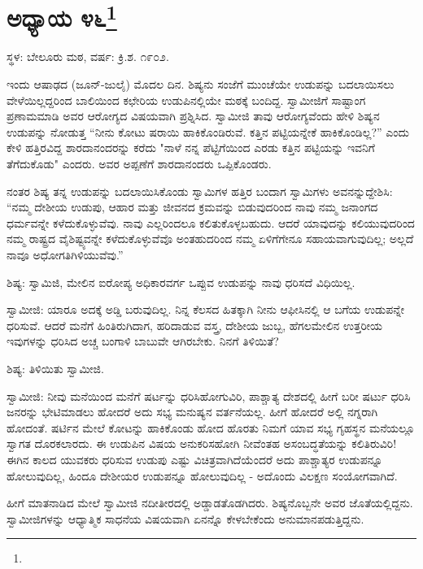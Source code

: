 \chapter[ಅಧ್ಯಾಯ ೪೬]{ಅಧ್ಯಾಯ ೪೬\protect\footnote{}}

\begin{center}
ಸ್ಥಳ: ಬೇಲೂರು ಮಠ, ವರ್ಷ: ಕ್ರಿ.ಶ. ೧೯೦೨.
\end{center}

ಇಂದು ಆಷಾಢದ (ಜೂನ್-ಜುಲೈ) ಮೊದಲ ದಿನ. ಶಿಷ್ಯನು ಸಂಜೆಗೆ ಮುಂಚೆಯೇ ಉಡುಪನ್ನು ಬದಲಾಯಿಸಲು ವೇಳೆಯಿಲ್ಲದ್ದರಿಂದ ಬಾಲಿಯಿಂದ ಕಛೇರಿಯ ಉಡುಪಿನಲ್ಲಿಯೇ ಮಠಕ್ಕೆ ಬಂದಿದ್ದ. ಸ್ವಾಮೀಜಿಗೆ ಸಾಷ್ಟಾಂಗ ಪ್ರಣಾಮಮಾಡಿ ಅವರ ಆರೋಗ್ಯದ ವಿಷಯವಾಗಿ ಪ್ರಶ್ನಿಸಿದ. ಸ್ವಾಮೀಜಿ ತಾವು ಆರೋಗ್ಯವೆಂದು ಹೇಳಿ ಶಿಷ್ಯನ ಉಡುಪನ್ನು ನೋಡುತ್ತ “ನೀನು ಕೋಟು ಷರಾಯಿ ಹಾಕಿಕೊಂಡಿರುವೆ. ಕತ್ತಿನ ಪಟ್ಟಿಯನ್ನೇಕೆ ಹಾಕಿಕೊಂಡಿಲ್ಲ?” ಎಂದು ಕೇಳಿ ಹತ್ತಿರವಿದ್ದ ಶಾರದಾನಂದರನ್ನು ಕರೆದು "ನಾಳೆ ನನ್ನ ಪೆಟ್ಟಿಗೆಯಿಂದ ಎರಡು ಕತ್ತಿನ ಪಟ್ಟಿಯನ್ನು ಇವನಿಗೆ ತೆಗೆದುಕೊಡು" ಎಂದರು. ಅವರ ಅಪ್ಪಣೆಗೆ ಶಾರದಾನಂದರು ಒಪ್ಪಿಕೊಂಡರು.

ನಂತರ ಶಿಷ್ಯ ತನ್ನ ಉಡುಪನ್ನು ಬದಲಾಯಿಸಿಕೊಂಡು ಸ್ವಾಮಿಗಳ ಹತ್ತಿರ ಬಂದಾಗ ಸ್ವಾಮಿಗಳು ಅವನನ್ನುದ್ದೇಶಿಸಿ: “ನಮ್ಮ ದೇಶೀಯ ಉಡುಪು, ಆಹಾರ ಮತ್ತು ಜೀವನದ ಕ್ರಮವನ್ನು ಬಿಡುವುದರಿಂದ ನಾವು ನಮ್ಮ ಜನಾಂಗದ ಧರ್ಮವನ್ನೇ ಕಳೆದುಕೊಳ್ಳುವೆವು. ನಾವು ಎಲ್ಲರಿಂದಲೂ ಕಲಿತುಕೊಳ್ಳಬಹುದು. ಆದರೆ ಯಾವುದನ್ನು ಕಲಿಯುವುದರಿಂದ ನಮ್ಮ ರಾಷ್ಟ್ರದ ವೈಶಿಷ್ಟ್ಯವನ್ನೇ ಕಳೆದುಕೊಳ್ಳುವೆವೊ ಅಂತಹುದರಿಂದ ನಮ್ಮ ಏಳಿಗೆಗೇನೂ ಸಹಾಯವಾಗುವುದಿಲ್ಲ; ಅಲ್ಲದೆ ನಾವೂ ಅಧೋಗತಿಗಿಳಿಯುವೆವು.”

ಶಿಷ್ಯ: ಸ್ವಾಮಿಜಿ, ಮೇಲಿನ ಐರೋಪ್ಯ ಅಧಿಕಾರವರ್ಗ ಒಪ್ಪುವ ಉಡುಪನ್ನು ನಾವು ಧರಿಸದೆ ವಿಧಿಯಿಲ್ಲ.

ಸ್ವಾಮೀಜಿ: ಯಾರೂ ಅದಕ್ಕೆ ಅಡ್ಡಿ ಬರುವುದಿಲ್ಲ. ನಿನ್ನ ಕೆಲಸದ ಹಿತಕ್ಕಾಗಿ ನೀನು ಆಫೀಸಿನಲ್ಲಿ ಆ ಬಗೆಯ ಉಡುಪನ್ನೇ ಧರಿಸುವೆ. ಆದರೆ ಮನೆಗೆ ಹಿಂತಿರುಗಿದಾಗ, ಹರಿದಾಡುವ ವಸ್ತ್ರ, ದೇಶೀಯ ಜುಬ್ಬ, ಹೆಗಲಮೇಲಿನ ಉತ್ತರೀಯ ಇವುಗಳನ್ನು ಧರಿಸಿದ ಅಚ್ಚ ಬಂಗಾಳಿ ಬಾಬುವೇ ಆಗಿರಬೇಕು. ನಿನಗೆ ತಿಳಿಯಿತೆ?

ಶಿಷ್ಯ: ತಿಳಿಯಿತು ಸ್ವಾಮೀಜಿ.

ಸ್ವಾಮೀಜಿ: ನೀವು ಮನೆಯಿಂದ ಮನೆಗೆ ಷರ್ಟನ್ನು ಧರಿಸಿಹೋಗುವಿರಿ, ಪಾಶ್ಚಾತ್ಯ ದೇಶದಲ್ಲಿ ಹೀಗೆ ಬರೀ ಷರ್ಟು ಧರಿಸಿ ಜನರನ್ನು ಭೇಟಿಮಾಡಲು ಹೋದರೆ ಅದು ಸಭ್ಯ ಮನುಷ್ಯನ ವರ್ತನೆಯಲ್ಲ. ಹೀಗೆ ಹೋದರೆ ಅಲ್ಲಿ ನಗ್ನರಾಗಿ ಹೋದಂತೆ. ಷರ್ಟಿನ ಮೇಲೆ ಕೋಟನ್ನು ಹಾಕಿಕೊಂಡು ಹೋದ ಹೊರತು ನಿಮಗೆ ಯಾವ ಸಭ್ಯ ಗೃಹಸ್ಥನ ಮನೆಯಲ್ಲೂ ಸ್ವಾಗತ ದೊರಕಲಾರದು. ಈ ಉಡುಪಿನ ವಿಷಯ ಅನುಕರಿಸಹೋಗಿ ನೀವೆಂತಹ ಅಸಂಬದ್ಧತೆಯನ್ನು ಕಲಿತಿರುವಿರಿ! ಈಗಿನ ಕಾಲದ ಯುವಕರು ಧರಿಸುವ ಉಡುಪು ಎಷ್ಟು ವಿಚಿತ್ರವಾಗಿದೆಯೆಂದರೆ ಅದು ಪಾಶ್ಚಾತ್ಯರ ಉಡುಪನ್ನೂ ಹೋಲುವುದಿಲ್ಲ, ಹಿಂದೂ ದೇಶೀಯರ ಉಡುಪನ್ನೂ ಹೋಲುವುದಿಲ್ಲ - ಅದೊಂದು ವಿಲಕ್ಷಣ ಸಂಯೋಗವಾಗಿದೆ.

ಹೀಗೆ ಮಾತನಾಡಿದ ಮೇಲೆ ಸ್ವಾಮೀಜಿ ನದೀತೀರದಲ್ಲಿ ಅಡ್ಡಾಡತೊಡಗಿದರು. ಶಿಷ್ಯನೊಬ್ಬನೇ ಅವರ ಜೊತೆಯಲ್ಲಿದ್ದನು. ಸ್ವಾಮೀಜಿಗಳನ್ನು ಆಧ್ಯಾತ್ಮಿಕ ಸಾಧನೆಯ ವಿಷಯವಾಗಿ ಏನನ್ನೊ ಕೇಳಬೇಕೆಂದು ಅನುಮಾನಪಡುತ್ತಿದ್ದನು.

